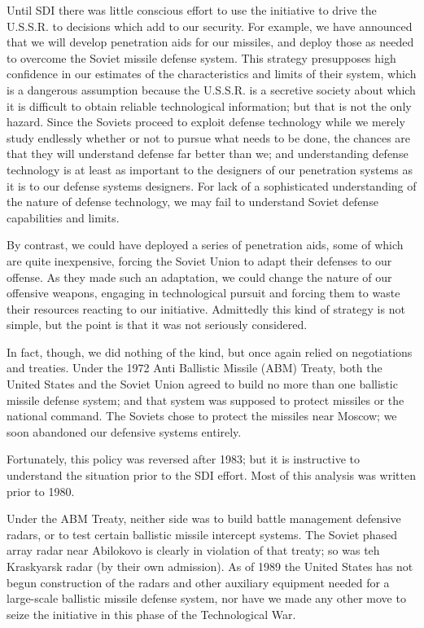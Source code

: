 Until SDI there was little conscious effort to use the initiative to drive the U.S.S.R. to decisions which add to our security. For example, we have announced that we will develop penetration aids for our missiles, and deploy those as needed to overcome the Soviet missile defense system. This strategy presupposes high confidence in our estimates of the characteristics and limits of their system, which is a dangerous assumption because the U.S.S.R. is a secretive society about which it is difficult to obtain reliable technological information; but that is not the only hazard. Since the Soviets proceed to exploit defense technology while we merely study endlessly whether or not to pursue what needs to be done, the chances are that they will understand defense far better than we; and understanding defense technology is at least as important to the designers of our penetration systems as it is to our defense systems designers. For lack of a sophisticated understanding of the nature of defense technology, we may fail to understand Soviet defense capabilities and limits.

By contrast, we could have deployed a series of penetration aids, some of which are quite inexpensive, forcing the Soviet Union to adapt their defenses to our offense. As they made such an adaptation, we could change the nature of our offensive weapons, engaging in technological pursuit and forcing them to waste their resources reacting to our initiative. Admittedly this kind of strategy is not simple, but the point is that it was not seriously considered.

In fact, though, we did nothing of the kind, but once again relied on negotiations and treaties. Under the 1972 Anti Ballistic Missile (ABM) Treaty, both the United States and the Soviet Union agreed to build no more than one ballistic missile defense system; and that system was supposed to protect missiles or the national command. The Soviets chose to protect the missiles near Moscow; we soon abandoned our defensive systems entirely.

\begin{mdframed}[backgroundcolor=black!10]
Fortunately, this policy was reversed after 1983; but it is instructive to understand the situation prior to the SDI effort. Most of this analysis was written prior to 1980.
\end{mdframed}

Under the ABM Treaty, neither side was to build battle management defensive radars, or to test certain ballistic missile intercept systems. The Soviet phased array radar near Abilokovo is clearly in violation of that treaty; so was teh Kraskyarsk radar (by their own admission). As of 1989 the United States has not begun construction of the radars and other auxiliary equipment needed for a large-scale ballistic missile defense system, nor have we made any other move to seize the initiative in this phase of the Technological War.

